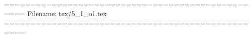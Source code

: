 ==================================================
Filename: tex/5_1_o1.tex
==================================================
















